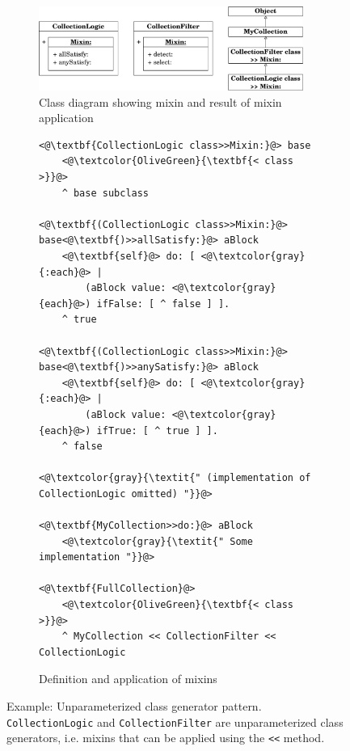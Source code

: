 \begin{figure}[!htp]
\begin{subfigure}[b]{\textwidth}
	\centering
	\includegraphics[width=0.95\textwidth]{usecase_classgen.pdf}
	\caption{Class diagram showing mixin and result of mixin application}
\end{subfigure}

\vspace{10pt}

\begin{subfigure}[b]{\textwidth}
\begin{lstlisting}
<@\textbf{CollectionLogic class>>Mixin:}@> base
    <@\textcolor{OliveGreen}{\textbf{< class >}}@>
    ^ base subclass

<@\textbf{(CollectionLogic class>>Mixin:}@> base<@\textbf{)>>allSatisfy:}@> aBlock
    <@\textbf{self}@> do: [ <@\textcolor{gray}{:each}@> | 
        (aBlock value: <@\textcolor{gray}{each}@>) ifFalse: [ ^ false ] ].
    ^ true

<@\textbf{(CollectionLogic class>>Mixin:}@> base<@\textbf{)>>anySatisfy:}@> aBlock
    <@\textbf{self}@> do: [ <@\textcolor{gray}{:each}@> | 
        (aBlock value: <@\textcolor{gray}{each}@>) ifTrue: [ ^ true ] ].
    ^ false

<@\textcolor{gray}{\textit{" (implementation of CollectionLogic omitted) "}}@>

<@\textbf{MyCollection>>do:}@> aBlock
    <@\textcolor{gray}{\textit{" Some implementation "}}@>

<@\textbf{FullCollection}@>
    <@\textcolor{OliveGreen}{\textbf{< class >}}@>
    ^ MyCollection << CollectionFilter << CollectionLogic
\end{lstlisting}
\caption{Definition and application of mixins}
\end{subfigure}
\caption[Example: Unparameterized class generator pattern]{Example: Unparameterized class generator pattern. \texttt{CollectionLogic} and \texttt{CollectionFilter} are unparameterized class generators, i.e. mixins that can be applied using the \texttt{<<} method.}
\label{fig:usecase_unparam_class_gen}
\end{figure}

